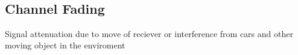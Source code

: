 ~\vspace{-2.5em}
\subsection{Channel Fading}
Signal attenuation due to move of reciever or interference from cars and other moving object in the enviroment
